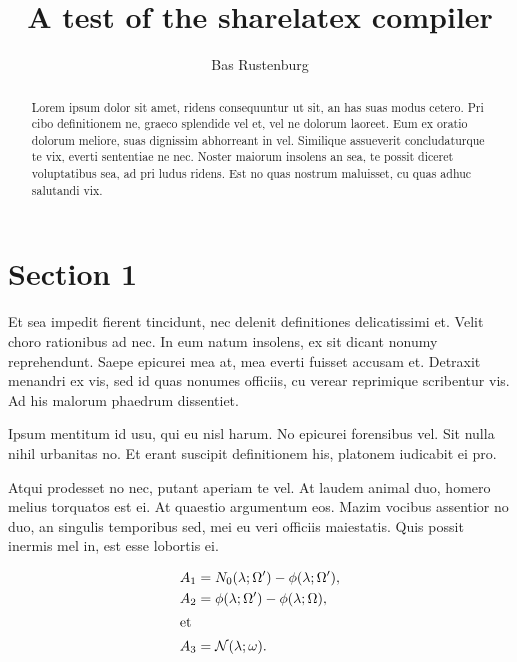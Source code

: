 \documentclass[a4paper,10pt]{article}
\title{A test of the sharelatex compiler}
\author{Bas Rustenburg}
\begin{document}
\maketitle

\begin{abstract}
Lorem ipsum dolor sit amet, ridens consequuntur ut sit, an has suas modus cetero.
Pri cibo definitionem ne, graeco splendide vel et, vel ne dolorum laoreet.
Eum ex oratio dolorum meliore, suas dignissim abhorreant in vel.
Similique assueverit concludaturque te vix, everti sententiae ne nec.
Noster maiorum insolens an sea, te possit diceret voluptatibus sea, ad pri ludus ridens.
Est no quas nostrum maluisset, cu quas adhuc salutandi vix.
\end{abstract}



\section{Section 1}
Et sea impedit fierent tincidunt, nec delenit definitiones delicatissimi et. Velit choro rationibus ad nec. In eum natum insolens, ex sit dicant nonumy reprehendunt. Saepe epicurei mea at, mea everti fuisset accusam et. Detraxit menandri ex vis, sed id quas nonumes officiis, cu verear reprimique scribentur vis. Ad his malorum phaedrum dissentiet.

Ipsum mentitum id usu, qui eu nisl harum. No epicurei forensibus vel. Sit nulla nihil urbanitas no. Et erant suscipit definitionem his, platonem iudicabit ei pro.

Atqui prodesset no nec, putant aperiam te vel. At laudem animal duo, homero melius torquatos est ei. At quaestio argumentum eos. Mazim vocibus assentior no duo, an singulis temporibus sed, mei eu veri officiis maiestatis. Quis possit inermis mel in, est esse lobortis ei.

\begin{align}
A_1&=N_0(\lambda;\Omega')-\phi(\lambda;\Omega'),\\
A_2&=\phi(\lambda;\Omega')-\phi(\lambda;\Omega),\\
\intertext{et}A_3&=\mathcal{N}(\lambda;\omega).
\end{align}
\end{document}
